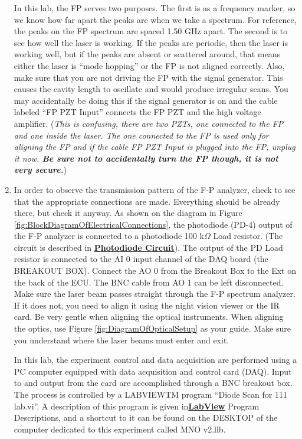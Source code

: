 \documentclass{../lab}
\begin{document}
\begin{enumerate}
\newpage
    
    In this lab, the FP serves two purposes. The first is as a frequency marker, so we know how far apart the peaks are when we take a spectrum. For reference, the peaks on the FP spectrum are spaced 1.50 GHz apart. The second is to see how well the laser is working. If the peaks are periodic, then the laser is working well, but if the peaks are absent or scattered around, that means either the laser is ``mode hopping'' or the FP is not aligned correctly. Also, make sure that you are not driving the FP with the signal generator. This causes the cavity length to oscillate and would produce irregular scans. You may accidentally be doing this if the signal generator is on and the cable labeled ``FP PZT Input'' connects the FP PZT and the high voltage amplifier. (\emph{This is confusing, there are two PZTs, one connected to the FP and one inside the laser. The one connected to the FP is used only for aligning the FP and if the cable FP PZT Input is plugged into the FP, unplug it now. \textbf{ Be sure not to accidentally turn the FP though, it is not very secure.}})
    
    \item In order to observe the transmission pattern of the F-P analyzer, check to see that the appropriate connections are made. Everything should be already there, but check it anyway. As shown on the diagram in Figure \ref{fig:BlockDiagramOfElectricalConnections}, the photodiode (PD-4) output of the F-P analyzer is connected to a photodiode 100 k$ \Omega $ Load resistor. (The circuit is described in \href{http://experimentationlab.berkeley.edu/node/120}{\textbf{Photodiode Circuit}}). The output of the PD Load resistor is connected to the AI 0 input channel of the DAQ board (the BREAKOUT BOX). Connect the AO 0 from the Breakout Box to the Ext on the back of the ECU. The BNC cable from AO 1 can be left disconnected. Make sure the laser beam passes straight through the F-P spectrum analyzer. If it does not, you need to align it using the night vision viewer or the IR card. Be very gentle when aligning the optical instruments. When aligning the optics, use Figure \ref{fig:DiagramOfOpticalSetup} as your guide. Make sure you understand where the laser beams must enter and exit.
    
    In this lab, the experiment control and data acquisition are performed using a PC computer equipped with data acquisition and control card (DAQ). Input to and output from the card are accomplished through a BNC breakout box. The process is controlled by a LABVIEWTM program ``Diode Scan for 111 lab.vi''. A description of this program is given in\href{http://experimentationlab.berkeley.edu/node/119}{\textbf{}}\href{http://experimentationlab.berkeley.edu/node/119}{\textbf{LabView}} Program Descriptions, and a shortcut to it can be found on the DESKTOP of the computer dedicated to this experiment called MNO v2.llb.
    

\end{enumerate}
\end{document}
